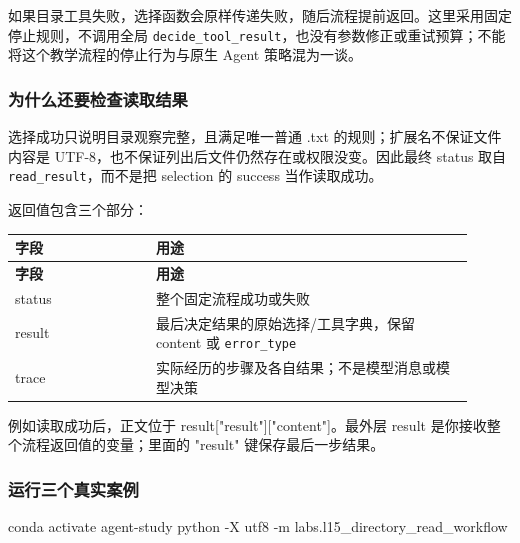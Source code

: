 \documentclass[UTF8,zihao=-4,fontset=fandol]{ctexart}
\begin{document}
如果目录工具失败，选择函数会原样传递失败，随后流程提前返回。这里采用固定停止规则，不调用全局 \nolinkurl{decide_tool_result}，也没有参数修正或重试预算；不能将这个教学流程的停止行为与原生 Agent 策略混为一谈。

\subsubsection{为什么还要检查读取结果}

选择成功只说明目录观察完整，且满足唯一普通 .txt 的规则；扩展名不保证文件内容是 UTF-8，也不保证列出后文件仍然存在或权限没变。因此最终 status 取自 \nolinkurl{read_result}，而不是把 selection 的 success 当作读取成功。

返回值包含三个部分：

{\small\setlength{\tabcolsep}{4pt}
\renewcommand{\arraystretch}{1.25}
\begin{longtable}{>{\raggedright\arraybackslash}p{0.28\linewidth}>{\raggedright\arraybackslash}p{0.63\linewidth}}
\toprule
\textbf{字段} & \textbf{用途} \\
\midrule\endfirsthead
\toprule
\textbf{字段} & \textbf{用途} \\
\midrule\endhead
\bottomrule\endfoot
status & 整个固定流程成功或失败 \\
result & 最后决定结果的原始选择/工具字典，保留 content 或 \nolinkurl{error_type} \\
trace & 实际经历的步骤及各自结果；不是模型消息或模型决策 \\
\end{longtable}}

例如读取成功后，正文位于 result["result"]["content"]。最外层 result 是你接收整个流程返回值的变量；里面的 "result" 键保存最后一步结果。

\subsubsection{运行三个真实案例}

\begin{Code}
conda activate agent-study
python -X utf8 -m labs.l15_directory_read_workflow
\end{Code}
\end{document}

